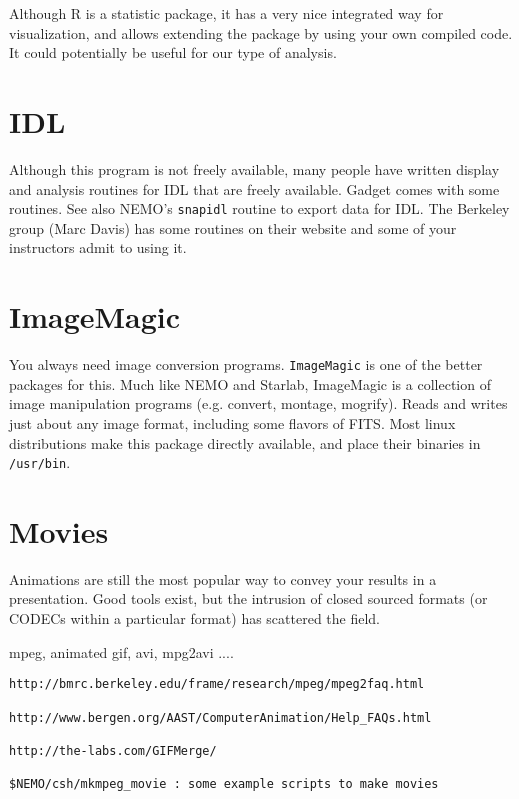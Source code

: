 \begin{itemize}
\begin{itemize}
Although R is a statistic package, it has a very nice integrated
way for visualization, and allows extending the package by using
your own compiled code. It could potentially be useful for our
type of analysis.

\section{IDL}

Although this program is not freely available, 
many people have written display and 
analysis routines for IDL that are freely available.
Gadget comes with some
routines. See also NEMO's {\tt snapidl} routine to export data for IDL.
The Berkeley group (Marc Davis) has some routines on their website
and some of your instructors admit to using it.


\section{ImageMagic}

You always need image conversion programs. {\tt ImageMagic} is one of 
the better packages for this. Much like NEMO and Starlab, ImageMagic
is a collection of image manipulation programs (e.g. convert, montage, mogrify).
Reads and writes just about any image format, including some flavors
of FITS. Most linux
distributions make this package directly available, and place their
binaries in {\tt /usr/bin}.

\section{Movies}

Animations are still the most popular way to convey your results
in a presentation. Good tools exist, but the intrusion of closed
sourced formats (or CODECs within a particular format)
has scattered the field.

mpeg, animated gif, avi, mpg2avi ....

\begin{verbatim}
http://bmrc.berkeley.edu/frame/research/mpeg/mpeg2faq.html

http://www.bergen.org/AAST/ComputerAnimation/Help_FAQs.html

http://the-labs.com/GIFMerge/

$NEMO/csh/mkmpeg_movie : some example scripts to make movies

\end{verbatim} 

\end{itemize}
\end{itemize}
